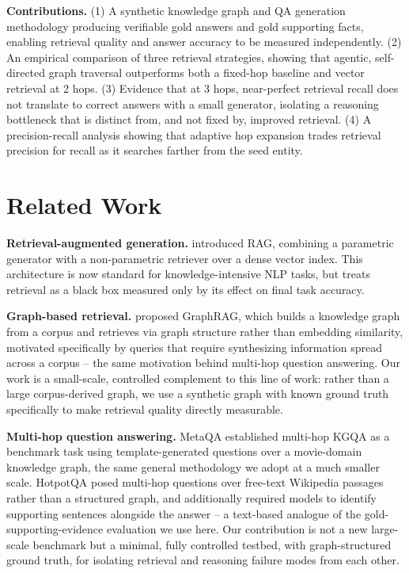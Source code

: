 \documentclass[11pt]{article}
\begin{document}
\textbf{Contributions.} (1) A synthetic knowledge graph and QA generation methodology producing verifiable gold answers and gold supporting facts, enabling retrieval quality and answer accuracy to be measured independently. (2) An empirical comparison of three retrieval strategies, showing that agentic, self-directed graph traversal outperforms both a fixed-hop baseline and vector retrieval at 2 hops. (3) Evidence that at 3 hops, near-perfect retrieval recall does not translate to correct answers with a small generator, isolating a reasoning bottleneck that is distinct from, and not fixed by, improved retrieval. (4) A precision-recall analysis showing that adaptive hop expansion trades retrieval precision for recall as it searches farther from the seed entity.

\section{Related Work}

\textbf{Retrieval-augmented generation.} \citet{lewis2020rag} introduced RAG, combining a parametric generator with a non-parametric retriever over a dense vector index. This architecture is now standard for knowledge-intensive NLP tasks, but treats retrieval as a black box measured only by its effect on final task accuracy.

\textbf{Graph-based retrieval.} \citet{edge2024graphrag} proposed GraphRAG, which builds a knowledge graph from a corpus and retrieves via graph structure rather than embedding similarity, motivated specifically by queries that require synthesizing information spread across a corpus -- the same motivation behind multi-hop question answering. Our work is a small-scale, controlled complement to this line of work: rather than a large corpus-derived graph, we use a synthetic graph with known ground truth specifically to make retrieval quality directly measurable.

\textbf{Multi-hop question answering.} MetaQA \citep{zhang2018metaqa} established multi-hop KGQA as a benchmark task using template-generated questions over a movie-domain knowledge graph, the same general methodology we adopt at a much smaller scale. HotpotQA \citep{yang2018hotpotqa} posed multi-hop questions over free-text Wikipedia passages rather than a structured graph, and additionally required models to identify supporting sentences alongside the answer -- a text-based analogue of the gold-supporting-evidence evaluation we use here. Our contribution is not a new large-scale benchmark but a minimal, fully controlled testbed, with graph-structured ground truth, for isolating retrieval and reasoning failure modes from each other.
\end{document}
